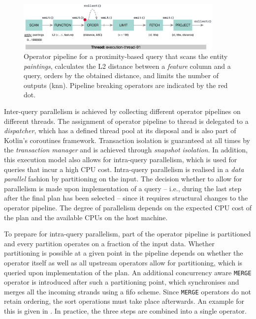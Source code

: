 \begin{figure}[bt]
    \centering
    \includegraphics[width=0.9\textwidth]{figures/execution-model-simple}
    \caption{Operator pipeline for a proximity-based query that scans the entity \emph{paintings}, calculates the L2 distance between a \emph{feature} column and a query, orders by the obtained distance, and limits the number of outputs (\acrshort{knn}). Pipeline breaking operators are indicated by the red dot.}
    \label{figure:cottontail_execution_model_simple}
\end{figure}

Inter-query parallelism is achieved by collecting different operator pipelines on different threads. The assignment of operator pipeline to thread is delegated to a \emph{dispatcher}, which has a defined thread pool at its disposal and is also part of Kotlin's coroutines framework. Transaction isolation is guaranteed at all times by the \emph{transaction manager} and is achieved through \emph{snapshot isolation}. In addition, this execution model also allows for intra-query parallelism, which is used for queries that incur a high CPU cost. Intra-query parallelism is realised in a \emph{data parallel} fashion by partitioning on the input. The decision whether to allow for parallelism is made upon implementation of a query -- i.e., during the last step after the final plan has been selected -- since it requires structural changes to the operator pipeline. The degree of parallelism depends on the expected CPU cost of the plan and the available CPUs on the host machine.

To prepare for intra-query parallelism, part of the operator pipeline is partitioned and every partition operates on a fraction of the input data. Whether partitioning is possible at a given point in the pipeline depends on whether the operator itself as well as all upstream operators allow for partitioning, which is queried upon implementation of the plan. An additional concurrency aware \texttt{MERGE} operator is introduced after such a partitioning point, which synchronises and merges all the incoming strands using a \acrshort{fifo} scheme. Since \texttt{MERGE} operators do not retain ordering, the sort operations must take place afterwards. An example for this is given in . In practice, the three steps are combined into a single operator.

